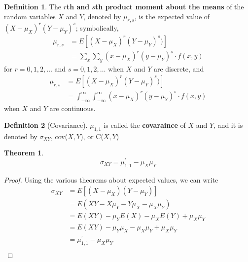\documentclass[
10pt,reqno
]{amsart}
\newtheorem{theorem}{Theorem}[section]
\theoremstyle{definition}
\newtheorem{definition}{Definition}[section]
\begin{document}
\begin{definition}
The \textbf{\(r\)th and \(s\)th product moment about the means} of the random variables \(X\) and \(Y\), denoted by \(\mu_{r,s}\), is the expected value of \((X-\mu_X)^r (Y - \mu_Y)^s\); symbolically,
\begin{align*}
\mu_{r,s} &= E[(X- \mu_X)^r (Y - \mu_Y)^s)]\\
&=\sum_x \sum_y (x - \mu_X)^r (y - \mu_Y)^s \cdot f(x,y)
\end{align*}
for \(r=0,1,2, \ldots \) and \(s=0,1,2,\ldots\) when \(X\) and \(Y\) are discrete, and
\begin{align*}
\mu_{r,s} &= E[(X- \mu_X)^r (Y - \mu_Y)^s)]\\
&= \int_{- \infty}^{\infty} \int_{- \infty}^{\infty} (x - \mu_X)^r (y - \mu_Y)^s \cdot f(x,y)
\end{align*}
when \(X\) and \(Y\) are continuous.
\end{definition}

\begin{definition}[Covariance]
\(\mu_{1,1}\) is called the \textbf{covaraince} of \(X\) and \(Y\), and it is denoted by \(\sigma_{XY}\), cov(\(X,Y\)), or C(\(X,Y\))
\end{definition}

\begin{theorem}
\[
\sigma_{XY} = \mu_{1,1}^{'}-\mu_{X} \mu_{Y}
\]
\end{theorem}

\begin{proof}
Using the various theorems about expected values, we can write
\begin{align*}
\sigma_{XY} &= E[(X-\mu_X)(Y-\mu_Y)]\\
&=E(XY-X \mu_Y - Y \mu_X - \mu_X \mu_Y)\\
&=E(XY) - \mu_Y E(X)-\mu_X E(Y) +\mu_X \mu_Y\\
&=E(XY) - \mu_Y \mu_X-\mu_X \mu_Y  +\mu_X \mu_Y\\
&=\mu_{1,1}^{'}-\mu_{X} \mu_{Y}\\
\end{align*}
\end{proof}
\end{document}
